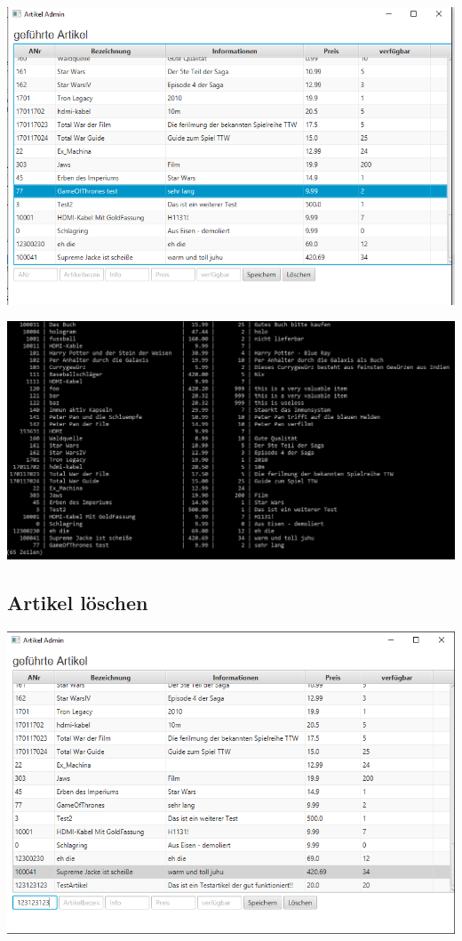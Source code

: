 \begin{minipage}{\linewidth}
	\centering
	\includegraphics[width=0.8\linewidth]{images/aendern2}
\end{minipage}

\begin{minipage}{\linewidth}
	\centering
	\includegraphics[width=0.8\linewidth]{images/aendern3}
\end{minipage}

\subsection{Artikel löschen}
\begin{minipage}{\linewidth}
	\centering
	\includegraphics[width=0.8\linewidth]{images/loeschen1}
\end{minipage}

